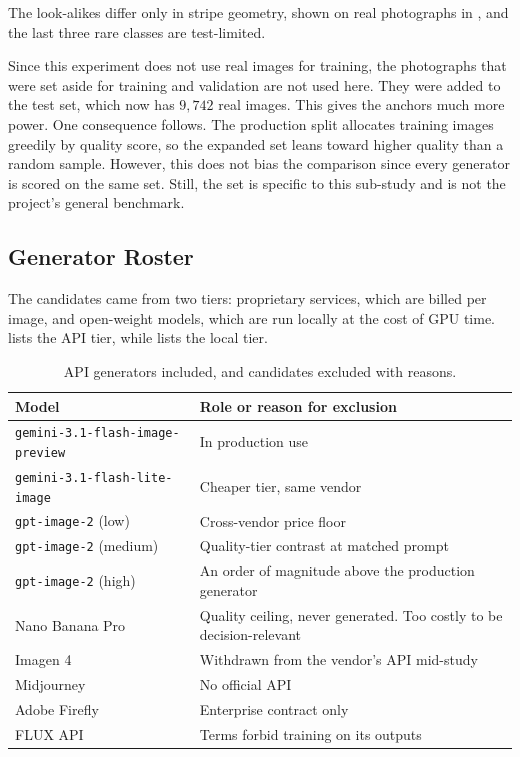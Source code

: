 The look-alikes differ only in stripe geometry, shown on real photographs in , and the last three rare classes are test-limited.

Since this experiment does not use real images for training, the photographs that were set aside for training and validation are not used here. They were added to the test set, which now has $9{,}742$ real images. This gives the anchors much more power. One consequence follows. The production split allocates training images greedily by quality score, so the expanded set leans toward higher quality than a random sample. However, this does not bias the comparison since every generator is scored on the same set. Still, the set is specific to this sub-study and is not the project's general benchmark.

\subsection{Generator Roster}\label{sec:generator_comparison_roster}

The candidates came from two tiers: proprietary services, which are billed per image, and open-weight models, which are run locally at the cost of GPU time.  lists the API tier, while  lists the local tier.

\begin{table}[htbp]
\centering
\caption[API generators included and excluded]{API generators included, and candidates excluded with reasons.}
\label{tab:generator-api-roster}
\begin{tabularx}{\textwidth}{@{}lX@{}}
\toprule
Model & Role or reason for exclusion \\
\midrule
\texttt{gemini-3.1-flash-image-preview} \cite{GeminiAPI} & In production use \\
\texttt{gemini-3.1-flash-lite-image} & Cheaper tier, same vendor \\
\texttt{gpt-image-2} (low) \cite{ImageGenerationOpenAI} & Cross-vendor price floor \\
\texttt{gpt-image-2} (medium) & Quality-tier contrast at matched prompt \\
\midrule
\texttt{gpt-image-2} (high) & An order of magnitude above the production generator \\
Nano Banana Pro & Quality ceiling, never generated. Too costly to be decision-relevant \\
Imagen 4 & Withdrawn from the vendor's API mid-study \\
Midjourney & No official API \\
Adobe Firefly & Enterprise contract only \\
FLUX API & Terms forbid training on its outputs \\
\bottomrule
\end{tabularx}
\end{table}

